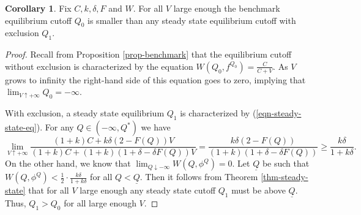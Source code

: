 \documentclass[12pt]{article}
\theoremstyle{plain}
\theoremstyle{definition}
\newtheorem{corollary}{Corollary}
\theoremstyle{remark}
\begin{document}
\begin{corollary}\label{coro-comparison-large-V}
    Fix $C,k,\delta,F$ and $W$. For all $V$ large enough the benchmark equilibrium cutoff $Q_0$ is smaller than any steady state equilibrium cutoff with exclusion $Q_1$. 
\end{corollary}
    
\begin{proof}
    Recall from Proposition \ref{prop-benchmark} that the equilibrium cutoff without exclusion is characterized by the equation $W(Q_0,f^{Q_0})=\frac{C}{C+V}$. As $V$ grows to infinity the right-hand side of this equation goes to zero, implying that $\lim_{V\uparrow +\infty} Q_0=-\infty$. 
    
    With exclusion, a steady state equilibrium $Q_1$ is characterized by (\ref{eqn-steady-state-eq}). For any $Q\in (-\infty,Q^*)$ we have 
    $$\lim_{V\uparrow +\infty} \frac{(1+k)C+k\delta (2-F(Q))V}{(1+k)C+(1+k)(1+\delta -\delta F(Q))V} = \frac{k\delta(2-F(Q))}{(1+k)(1+\delta-\delta F(Q))}\ge \frac{k\delta}{1+k\delta}.$$
    On the other hand, we know that $\lim_{Q\downarrow -\infty} W(Q,\phi^{Q})=0$. Let $\underline{Q}$ be such that $W(Q,\phi^{Q})< \frac{1}{2} \cdot \frac{k\delta}{1+k\delta}$ for all $Q<\underline{Q}$. Then it follows from Theorem \ref{thm-steady-state} that for all $V$ large enough any steady state cutoff $Q_1$ must be above $\underline{Q}$. Thus, $Q_1>Q_0$ for all large enough $V$. 
\end{proof}
    


\end{document}
